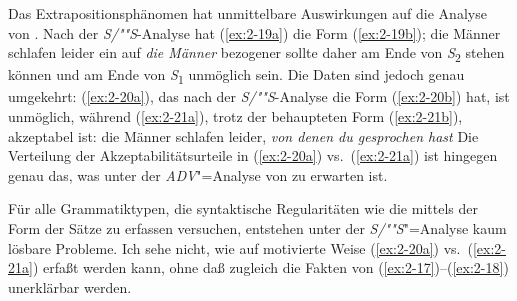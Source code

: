 \documentclass[output=paper]{langsci/langscibook}
\begin{document}
Das Extrapositionsphänomen hat unmittelbare Auswirkungen auf die Analyse von . Nach der \textit{S/""S}-Analyse hat (\ref{ex:2-19a}) die Form (\ref{ex:2-19b});
\eal
	\ex die Männer schlafen leider \label{ex:2-19a}
	 \label{ex:2-19b}
\zl
ein auf \textit{die Männer} bezogener  sollte daher am Ende von \textit{S}\textsubscript{2} stehen können und am Ende von \textit{S}\textsubscript{1} unmöglich sein. Die Daten sind jedoch genau umgekehrt: (\ref{ex:2-20a}), das nach der \textit{S/""S}-Analyse die Form (\ref{ex:2-20b}) hat, ist unmöglich, während (\ref{ex:2-21a}), trotz der behaupteten Form (\ref{ex:2-21b}), akzeptabel ist:
\eal
	 \label{ex:2-20a}
	 \label{ex:2-20b}
\zl 
\eal
	\ex die Männer schlafen leider, \textit{von denen du gesprochen hast} \label{ex:2-21a}
	 \label{ex:2-21b}
\zl 
Die Verteilung der Akzeptabilitätsurteile in (\ref{ex:2-20a}) vs.\  (\ref{ex:2-21a}) ist hingegen genau das, was unter der \textit{ADV}"=Analyse von  zu erwarten ist.

Für alle Grammatiktypen, die syntaktische Regularitäten wie die  mittels der  Form der Sätze zu erfassen versuchen, entstehen unter der \textit{S/""S}"=Analyse kaum lösbare Probleme. Ich sehe nicht, wie auf motivierte Weise (\ref{ex:2-20a}) vs.\ (\ref{ex:2-21a}) erfaßt werden kann, ohne daß zugleich die Fakten von (\ref{ex:2-17})--(\ref{ex:2-18}) unerklärbar werden.
\end{document}
